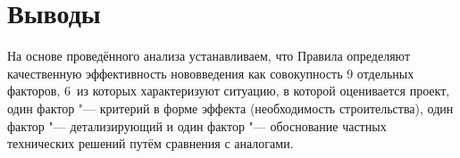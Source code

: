\documentclass[a4paper, 12pt, numbers=enddot]{scrartcl}
\begin{document}
\section{Выводы}
На основе проведённого анализа устанавливаем, что Правила определяют
качественную эффективность нововведения как совокупность 9 отдельных факторов,
6~из которых характеризуют ситуацию, в которой оценивается проект, один фактор
"--- критерий в форме эффекта (необходимость строительства), один фактор "---
детализирующий и один фактор "--- обоснование частных технических решений путём
сравнения с аналогами.
\end{document}
